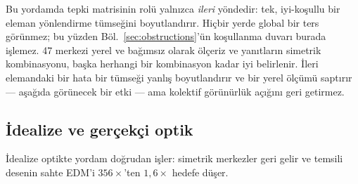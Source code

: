 \documentclass[aps,prab,reprint,superscriptaddress,nofootinbib]{revtex4-2}
\begin{document}
Bu yordamda tepki matrisinin rolü yalnızca \emph{ileri} yöndedir: tek, iyi-koşullu
bir eleman yönlendirme tümseğini boyutlandırır. Hiçbir yerde global bir ters
görünmez; bu yüzden Böl.~\ref{sec:obstructions}'ün koşullanma duvarı burada işlemez.
47 merkezi yerel ve bağımsız olarak ölçeriz ve yanıtların simetrik kombinasyonu,
başka herhangi bir kombinasyon kadar iyi belirlenir. İleri elemandaki bir hata bir
tümseği yanlış boyutlandırır ve bir yerel ölçümü saptırır --- aşağıda görünecek bir
etki --- ama kolektif görünürlük açığını geri getirmez.

\subsection{İdealize ve gerçekçi optik}
\label{sec:bbareal}

İdealize optikte yordam doğrudan işler: simetrik merkezler geri gelir ve temsili
desenin sahte EDM'i $356\times$'ten $1{,}6\times$ hedefe düşer.
\end{document}
